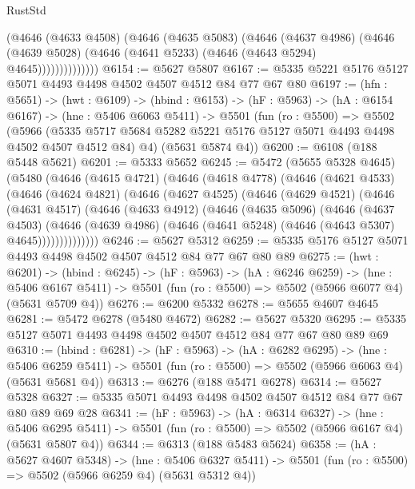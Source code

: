 \begin{lexlean}{RustStd}
\begin{coremodule}
                    (@4646
                      (@4633 @4508)
                      (@4646
                        (@4635 @5083)
                        (@4646
                          (@4637 @4986)
                          (@4646
                            (@4639 @5028)
                            (@4646 (@4641 @5233) (@4646 (@4643 @5294) @4645))))))))))))))
@6154 := @5627 @5807
@6167 := @5335 @5221 @5176 @5127 @5071 @4493 @4498 @4502 @4507 @4512 @84 @77 @67 @80
@6197 := (hfn : @5651) ->
  (hwt : @6109) ->
  (hbind : @6153) ->
  (hF : @5963) ->
  (hA : @6154 @6167) ->
  (hne : @5406 @6063 @5411) ->
  @5501
    (fun (ro : @5500) =>
    @5502
      (@5966 (@5335 @5717 @5684 @5282 @5221 @5176 @5127 @5071 @4493 @4498 @4502 @4507 @4512 @84) @4)
      (@5631 @5874 @4))
@6200 := @6108 (@188 @5448 @5621)
@6201 := @5333 @5652
@6245 := @5472
    (@5655 @5328 @4645)
    (@5480
      (@4646
        (@4615 @4721)
        (@4646
          (@4618 @4778)
          (@4646
            (@4621 @4533)
            (@4646
              (@4624 @4821)
              (@4646
                (@4627 @4525)
                (@4646
                  (@4629 @4521)
                  (@4646
                    (@4631 @4517)
                    (@4646
                      (@4633 @4912)
                      (@4646
                        (@4635 @5096)
                        (@4646
                          (@4637 @4503)
                          (@4646
                            (@4639 @4986)
                            (@4646 (@4641 @5248) (@4646 (@4643 @5307) @4645))))))))))))))
@6246 := @5627 @5312
@6259 := @5335 @5176 @5127 @5071 @4493 @4498 @4502 @4507 @4512 @84 @77 @67 @80 @89
@6275 := (hwt : @6201) ->
  (hbind : @6245) ->
  (hF : @5963) ->
  (hA : @6246 @6259) ->
  (hne : @5406 @6167 @5411) -> @5501 (fun (ro : @5500) => @5502 (@5966 @6077 @4) (@5631 @5709 @4))
@6276 := @6200 @5332
@6278 := @5655 @4607 @4645
@6281 := @5472 @6278 (@5480 @4672)
@6282 := @5627 @5320
@6295 := @5335 @5127 @5071 @4493 @4498 @4502 @4507 @4512 @84 @77 @67 @80 @89 @69
@6310 := (hbind : @6281) ->
  (hF : @5963) ->
  (hA : @6282 @6295) ->
  (hne : @5406 @6259 @5411) -> @5501 (fun (ro : @5500) => @5502 (@5966 @6063 @4) (@5631 @5681 @4))
@6313 := @6276 (@188 @5471 @6278)
@6314 := @5627 @5328
@6327 := @5335 @5071 @4493 @4498 @4502 @4507 @4512 @84 @77 @67 @80 @89 @69 @28
@6341 := (hF : @5963) ->
  (hA : @6314 @6327) ->
  (hne : @5406 @6295 @5411) -> @5501 (fun (ro : @5500) => @5502 (@5966 @6167 @4) (@5631 @5807 @4))
@6344 := @6313 (@188 @5483 @5624)
@6358 := (hA : @5627 @4607 @5348) ->
  (hne : @5406 @6327 @5411) -> @5501 (fun (ro : @5500) => @5502 (@5966 @6259 @4) (@5631 @5312 @4))

\end{coremodule}
\end{lexlean}
